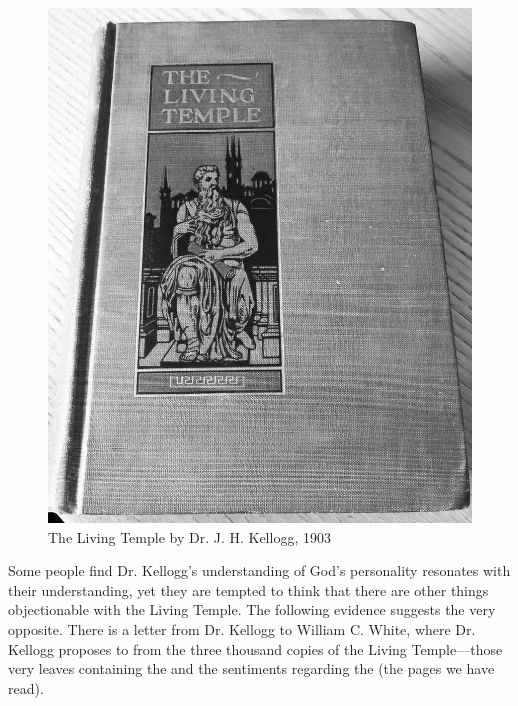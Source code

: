 \begin{figure}[h]
    \centering
    \includegraphics[width=1\linewidth]{images/TLT.jpg}
    \caption*{The Living Temple by Dr. J. H. Kellogg, 1903}
    \label{fig:tlt}
\end{figure}

Some people find Dr. Kellogg’s understanding of God’s personality resonates with their understanding, yet they are tempted to think that there are other things objectionable with the Living Temple. The following evidence suggests the very opposite. There is a letter from Dr. Kellogg to William C. White, where Dr. Kellogg proposes to  from the three thousand copies of the Living Temple—those very leaves containing the  and the sentiments regarding the  (the pages we have read).

